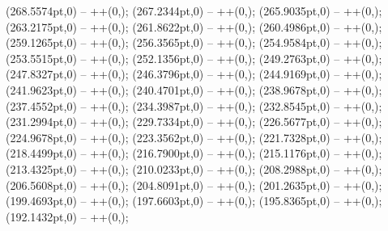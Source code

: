 {   (268.5574pt,0) -- ++(0,\doiscentesimos);
   (267.2344pt,0) -- ++(0,\doiscentesimos);
   (265.9035pt,0) -- ++(0,\doiscentesimos);
   (263.2175pt,0) -- ++(0,\doiscentesimos);
   (261.8622pt,0) -- ++(0,\doiscentesimos);
   (260.4986pt,0) -- ++(0,\doiscentesimos);
   (259.1265pt,0) -- ++(0,\doiscentesimos);
   (256.3565pt,0) -- ++(0,\doiscentesimos);
   (254.9584pt,0) -- ++(0,\doiscentesimos);
   (253.5515pt,0) -- ++(0,\doiscentesimos);
   (252.1356pt,0) -- ++(0,\doiscentesimos);
   (249.2763pt,0) -- ++(0,\doiscentesimos);
   (247.8327pt,0) -- ++(0,\doiscentesimos);
   (246.3796pt,0) -- ++(0,\doiscentesimos);
   (244.9169pt,0) -- ++(0,\doiscentesimos);
   (241.9623pt,0) -- ++(0,\doiscentesimos);
   (240.4701pt,0) -- ++(0,\doiscentesimos);
   (238.9678pt,0) -- ++(0,\doiscentesimos);
   (237.4552pt,0) -- ++(0,\doiscentesimos);
   (234.3987pt,0) -- ++(0,\doiscentesimos);
   (232.8545pt,0) -- ++(0,\doiscentesimos);
   (231.2994pt,0) -- ++(0,\doiscentesimos);
   (229.7334pt,0) -- ++(0,\doiscentesimos);
   (226.5677pt,0) -- ++(0,\doiscentesimos);
   (224.9678pt,0) -- ++(0,\doiscentesimos);
   (223.3562pt,0) -- ++(0,\doiscentesimos);
   (221.7328pt,0) -- ++(0,\doiscentesimos);
   (218.4499pt,0) -- ++(0,\doiscentesimos);
   (216.7900pt,0) -- ++(0,\doiscentesimos);
   (215.1176pt,0) -- ++(0,\doiscentesimos);
   (213.4325pt,0) -- ++(0,\doiscentesimos);
   (210.0233pt,0) -- ++(0,\doiscentesimos);
   (208.2988pt,0) -- ++(0,\doiscentesimos);
   (206.5608pt,0) -- ++(0,\doiscentesimos);
   (204.8091pt,0) -- ++(0,\doiscentesimos);
   (201.2635pt,0) -- ++(0,\doiscentesimos);
   (199.4693pt,0) -- ++(0,\doiscentesimos);
   (197.6603pt,0) -- ++(0,\doiscentesimos);
   (195.8365pt,0) -- ++(0,\doiscentesimos);
   (192.1432pt,0) -- ++(0,\doiscentesimos);
}
